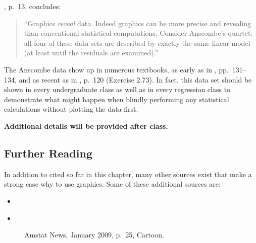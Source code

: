 \documentclass[12pt,letterpaper,final]{article}
\begin{document}
\cite{Tu83}, p.~13, concludes: 
\begin{quotation}
``Graphics {\it reveal} data. Indeed graphics can be more precise and 
revealing than conventional statistical computations. Consider
Anscombe's quartet: all four of these data sets are described by 
exactly the same linear model (at least until the residuals are 
examined).''
\end{quotation}

The Anscombe data show up in numerous textbooks, as
early as in \cite{Tu74}, pp.~131--134, and as recent as
in \cite{MMC2012}, p.~120 (Exercise 2.73).
In fact, this data set should be shown in every undergraduate
class as well as in every regression class to demonstrate
what might happen when blindly performing any statistical
calculations without plotting the data first.


\else
{\bf Additional details will be provided after class.}
\fi


\newpage


\subsection{Further Reading}

In addition to \cite{Un2015}
cited so far in this chapter, many other sources exist that
make a strong case why to use graphics. 
Some of these additional sources are:

\begin{itemize}
\item \cite{Ans73}

\item \cite{Tuk77}

\end{itemize}



\begin{figure}[ht]
\caption{\label{AmstatNews_Jan2009_p25_Fig}
Amstat News, January 2009, p.~25, Cartoon.
}
\end{figure}


\newpage


\end{document}

